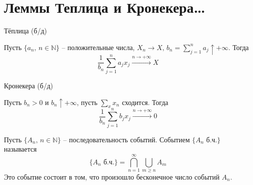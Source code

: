 \section{Леммы Теплица и Кронекера\dots}
\begin{lemma}
  Тёплица (б/д)

  Пусть $\{a_n,\, n \in \mathbb{N}\}$ -- положительные числа, $X_n \to X,\, b_n = \sum_{j = 1}^n a_j  \uparrow +\infty$. Тогда
  \[\frac{1}{b_n}\sum_{j = 1}^n a_jx_j \stackrel{n \to +\infty}{\to} X\]
\end{lemma}

\begin{lemma}
  Кронекера (б/д)

  Пусть $b_n > 0$ и $b_n \uparrow +\infty$, пусть $\sum_x x_n$ сходится. Тогда
  \[\frac{1}{b_n}\sum_{j = 1}^n b_jx_j \stackrel{n \to +\infty}{\to} 0\]
\end{lemma}

\begin{definition}
  Пусть $\{A_n,\, n \in \mathbb{N}\}$ -- последовательность событий. Событием $\{A_n \text{ б.ч.}\}$ называется
  \[\{A_n \text{ б.ч.}\} = \bigcap_{n = 1}^\infty \bigcup_{m \geq n} A_m\]
  Это событие состоит в том, что произошло бесконечное число событий $A_n$.
\end{definition}



